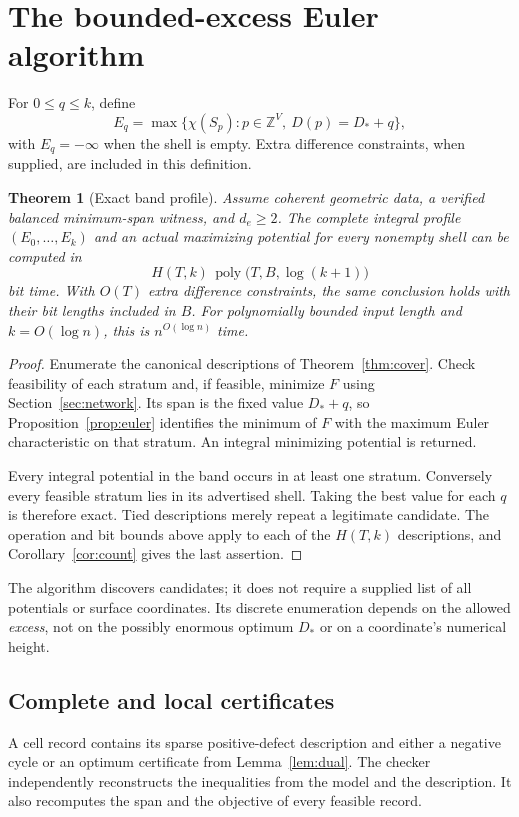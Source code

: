 \documentclass[11pt,letterpaper]{article}
\newtheorem{theorem}{Theorem}[section]
\theoremstyle{definition}
\newcommand{\Z}{\mathbb Z}
\newcommand{\poly}{\operatorname{poly}}
\begin{document}
\section{The bounded-excess Euler algorithm}\label{sec:band}
For $0\leq q\leq k$, define
\[
 E_q=\max\{\chi(S_p):p\in\Z^V,\ D(p)=D_*+q\},
\]
with $E_q=-\infty$ when the shell is empty. Extra difference constraints, when supplied, are included in this definition.

\begin{theorem}[Exact band profile]\label{thm:band}
Assume coherent geometric data, a verified balanced minimum-span witness, and $d_e\geq2$. The complete integral profile $(E_0,\ldots,E_k)$ and an actual maximizing potential for every nonempty shell can be computed in
\begin{equation}\label{eq:bandcomplexity}
 H(T,k)\,\poly\bigl(T,B,\log(k+1)\bigr)
\end{equation}
bit time. With $O(T)$ extra difference constraints, the same conclusion holds with their bit lengths included in $B$. For polynomially bounded input length and $k=O(\log n)$, this is $n^{O(\log n)}$ time.
\end{theorem}
\begin{proof}
Enumerate the canonical descriptions of Theorem~\ref{thm:cover}. Check feasibility of each stratum and, if feasible, minimize $F$ using Section~\ref{sec:network}. Its span is the fixed value $D_*+q$, so Proposition~\ref{prop:euler} identifies the minimum of $F$ with the maximum Euler characteristic on that stratum. An integral minimizing potential is returned.

Every integral potential in the band occurs in at least one stratum. Conversely every feasible stratum lies in its advertised shell. Taking the best value for each $q$ is therefore exact. Tied descriptions merely repeat a legitimate candidate. The operation and bit bounds above apply to each of the $H(T,k)$ descriptions, and Corollary~\ref{cor:count} gives the last assertion.
\end{proof}

The algorithm discovers candidates; it does not require a supplied list of all potentials or surface coordinates. Its discrete enumeration depends on the allowed \emph{excess}, not on the possibly enormous optimum $D_*$ or on a coordinate's numerical height.

\subsection{Complete and local certificates}
A cell record contains its sparse positive-defect description and either a negative cycle or an optimum certificate from Lemma~\ref{lem:dual}. The checker independently reconstructs the inequalities from the model and the description. It also recomputes the span and the objective of every feasible record.
\end{document}
